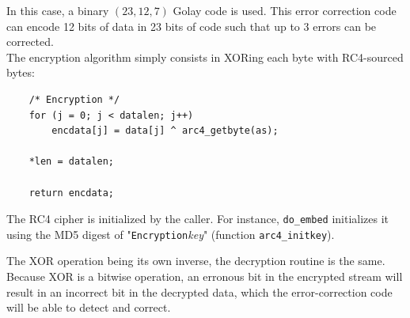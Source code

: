 \documentclass{article}
\begin{document}
In this case, a binary $(23,12,7)$ Golay code is used. This error correction code can encode 12 bits of data in 23 bits of code such that up to $3$ errors can be corrected. \\

The encryption algorithm simply consists in XORing each byte with RC4-sourced bytes:
\begin{verbatim}
	/* Encryption */
	for (j = 0; j < datalen; j++)
		encdata[j] = data[j] ^ arc4_getbyte(as);

	*len = datalen;
	
	return encdata;
\end{verbatim}

The RC4 cipher is initialized by the caller. For instance, \texttt{do\_embed} initializes it using the \textsc{MD5} digest of "\texttt{Encryption}\textit{key}" (function \texttt{arc4\_initkey}).

The XOR operation being its own inverse, the decryption routine is the same. Because XOR is a bitwise operation, an erronous bit in the encrypted stream will result in an incorrect bit in the decrypted data, which the error-correction code will be able to detect and correct. \\
\end{document}
